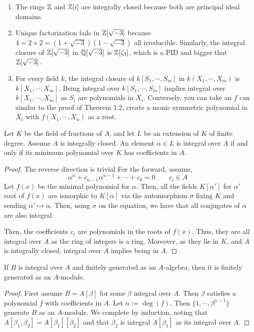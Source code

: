 \documentclass[12pt]{amsart}
\begin{document}
\begin{example} \bbni
    \begin{enumerate}
        \item The rings $\mathbb Z$ and $\mathbb Z[i]$ are integrally closed because both are principal ideal domains.
        \item Unique factorization fails in $\mathbb Z[\sqrt{-3}]$ because $4 = 2 \times 2 = (1+\sqrt{-3})(1-\sqrt{-3})$ all irreducible. Similarly, the integral closure of $\mathbb Z[\sqrt{-3}]$ in $\mathbb Q[\sqrt{-3}]$ is $\mathbb Z[\zeta_3]$, which is a PID and bigger that $\mathbb Z[\sqrt{-3}]$. 
        \item For every field $k$, the integral closure of $k[S_1, \cdots, S_m]$ in $k(X_1, \cdots, X_m)$ is $k[X_1, \cdots, X_m]$. Being integral over $k[S_1, \cdots, S_m]$ implies integral over $k[X_1, \cdots, X_m]$ as $S_i$ are polynomials in $X_i$. Conversely, you can take an $f$ can similar to the proof of Theorem 1.2, create a monic symmetric polynomial in $X_i$ with $f(X_1, \cdots, X_n)$ as a root.
    \end{enumerate}
\end{example}

\begin{proposition}
    Let $K$ be the field of fractions of $A$, and let $L$ be an extension of $K$ of finite degree. Assume $A$ is integrally closed. An element $\alpha \in L$ is integral over $A$ if and only if its minimum polynomial over $K$ has coefficients in $A$. 
\end{proposition}
\begin{proof}
    The reverse direction is trivial For the forward, assume, 
    \[ \alpha^n + c_{n-1}\alpha^{n-1} + \cdots + c_0 = 0 \qquad c_i \in A\]
    Let $f(x)$ be the minimal polynomial for $\alpha$. Then, all the fields $K[\alpha']$ for $\alpha'$ root of $f(x)$ are ismorphic to $K[\alpha]$ via the automorphism $\sigma$ fixing $K$ and sending $\alpha' \mapsto \alpha$. Then, using $\sigma$ on the equation, we have that all conjugates of $\alpha$ are also integral. 

    Then, the coefficients $c_i$ are polynomials in the roots of $f(x)$. Thus, they are all integral over $A$ as the ring of integers is a ring. Moreover, as they lie in $K$, and $A$ is integrally closed, integral over $A$ implies being in $A$. 
\end{proof}

\begin{proposition}
    If $B$ is integral over $A$ and finitely generated as an $A$-algebra, then it is finitely generated as an $A$-module. 
\end{proposition}
\begin{proof}
    First assume $B = A[\beta]$ for some $\beta$ integral over $A$. Then $\beta$ satisfies a polynomial $f$ with coefficients in $A$. Let $n := \deg(f)$. Then $\{1, \cdots, \beta^{n-1}\}$ generate $B$ as an $A$-module. We complete by induction, noting that $A[\beta_1,\beta_2] = A[\beta_1][\beta_2]$ and that $\beta_2$ is integral $A[\beta_1]$ as its integral over $A$. 
\end{proof}
\end{document}
